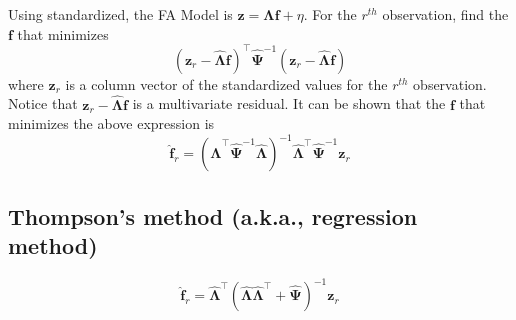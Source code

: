 \documentclass{article}
\begin{document}
Using standardized, the FA Model is $\mathbf{z}=\mathbf{\Lambda f}+\eta$. For the $r^{th}$ observation, find the $\mathbf{f}$ that minimizes
\[(\mathbf{z}_r-\hat{\mathbf{\Lambda}}\mathbf{f})^\intercal\hat{\mathbf{\Psi}}^{-1}(\mathbf{z}_r-\hat{\mathbf{\Lambda}}\mathbf{f})\]
where $\mathbf{z}_r$ is a column vector of the standardized values for the $r^{th}$ observation. Notice that $\mathbf{z}_r-\hat{\mathbf{\Lambda}}\mathbf{f}$ is a multivariate residual. It can be shown that the $\mathbf{f}$ that minimizes the above expression is 
\[\hat{\mathbf{f}}_r=(\hat{\mathbf{\Lambda}}^\intercal\hat{\mathbf{\Psi}}^{-1}\hat{\mathbf{\Lambda}})^{-1}\hat{\mathbf{\Lambda}}^\intercal\hat{\mathbf{\Psi}}^{-1}\mathbf{z}_r\]

\subsection{Thompson’s method (a.k.a., regression method)}

\[\hat{\mathbf{f}}_r=\hat{\mathbf{\Lambda}}^\intercal(\hat{\mathbf{\Lambda}}\hat{\mathbf{\Lambda}}^\intercal+\hat{\mathbf{\Psi}})^{-1}\mathbf{z}_r\]
\end{document}
